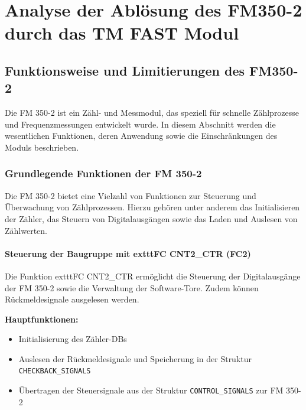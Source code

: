 \chapter{Analyse der Ablösung des FM350-2 durch das TM FAST Modul}

\section{Funktionsweise und Limitierungen des FM350-2}  

Die FM 350-2 ist ein Zähl- und Messmodul, das speziell für schnelle Zählprozesse und Frequenzmessungen entwickelt wurde. In diesem Abschnitt werden die wesentlichen Funktionen, deren Anwendung sowie die Einschränkungen des Moduls beschrieben.

\subsection{Grundlegende Funktionen der FM 350-2}

Die FM 350-2 bietet eine Vielzahl von Funktionen zur Steuerung und Überwachung von Zählprozessen. Hierzu gehören unter anderem das Initialisieren der Zähler, das Steuern von Digitalausgängen sowie das Laden und Auslesen von Zählwerten.

\subsubsection{Steuerung der Baugruppe mit 	exttt{FC CNT2\_CTR} (FC2)}

Die Funktion 	exttt{FC CNT2\_CTR} ermöglicht die Steuerung der Digitalausgänge der FM 350-2 sowie die Verwaltung der Software-Tore. Zudem können Rückmeldesignale ausgelesen werden.

\textbf{Hauptfunktionen:}
\begin{itemize}
    \item Initialisierung des Zähler-DBs
    \item Auslesen der Rückmeldesignale und Speicherung in der Struktur \texttt{CHECKBACK\_SIGNALS}
    \item Übertragen der Steuersignale aus der Struktur \texttt{CONTROL\_SIGNALS} zur FM 350-2
\end{itemize}

